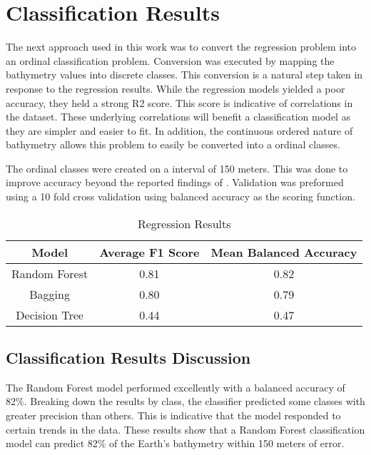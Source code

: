 \section{Classification Results}
\setlength{\parindent}{10ex}
The next approach used in this work was to convert the regression problem into an ordinal classification problem.
Conversion was executed by mapping the bathymetry values into discrete classes.
This conversion is a natural step taken in response to the regression results.
While the regression models yielded a poor accuracy, they held a strong R2 score.
This score is indicative of correlations in the dataset.
These underlying correlations will benefit a classification model as they are simpler and easier to fit.
In addition, the continuous ordered nature of bathymetry allows this problem to easily be converted into a ordinal classes.

\par
The ordinal classes were created on a interval of 150 meters.
This was done to improve accuracy beyond the reported findings of \cite{jena2012prediction}.
Validation was preformed using a 10 fold cross validation using balanced accuracy as the scoring function.

\begin{center}
    \begin{table}[htb]
        \begin{tabular}{|c c c|}
            \hline
			\textbf{Model} & \textbf{Average F1 Score} & \textbf{Mean Balanced Accuracy} \\
			\hline
			Random Forest & 0.81 & 0.82 \\
            Bagging & 0.80 & 0.79 \\
            Decision Tree & 0.44 & 0.47 \\
			\hline
        \end{tabular}
        \label{table:CLASSIFICATION_RESULTS}
        \caption{Regression Results}
    \end{table}
\end{center}

\subsection{Classification Results Discussion}
The Random Forest model performed excellently with a balanced accuracy of 82\%.
Breaking down the results by class, the classifier predicted some classes with greater precision than others.
This is indicative that the model responded to certain trends in the data.
These results show that a Random Forest classification model can predict 82\% of the Earth's bathymetry within 150 meters of error.

